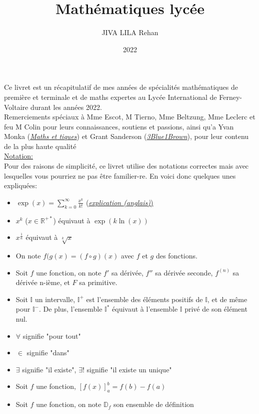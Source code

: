 \documentclass{article}
\title{Mathématiques lycée}
\author{JIVA LILA Rehan}
\date{2022\textemdash 2024}
\begin{document}
\maketitle
Ce livret est un récapitulatif de mes années de spécialités mathématiques de première et terminale et de maths expertes au Lycée International de Ferney-Voltaire durant les années 2022.\\
Remerciements spéciaux à Mme Escot, M Tierno, Mme Beltzung, Mme Leclerc et feu M Colin  pour leurs connaissances, soutiens et passions, ainsi qu'a Yvan Monka (\href{https://www.maths-et-tiques.fr/}{\textit{Maths et tiques}}) et Grant Sanderson (\href{https://www.3blue1brown.com}{\textit{3Blue1Brown}}), pour leur contenu de la plus haute qualité\\
\break
\underline{Notation:}\\
Pour des raisons de simplicité, ce livret utilise des notations correctes mais avec lesquelles vous pourriez ne pas être familier-re. En voici donc quelques unes expliquées:
\begin{itemize}
	\item $\exp(x) = \sum_{k=0}^{\infty} \frac{x^k}{k!}$ (\href{https://youtu.be/3d6DsjIBzJ4}{\underline{\textit{explication (anglais)})}}
	\item $x^k$ ($x\in\mathbb{R^{+*}}$) équivaut à $\exp(k\ln(x))$
	\item $x^\frac{1}{n}$ équivaut à $\sqrt[k]{x}$
	\item On note $f(g(x) = (f\circ g)(x)$ avec $f$ et $g$ des fonctions.
	\item Soit $f$ une fonction, on note $f'$ sa dérivée, $f''$ sa dérivée seconde, $f^{(n)}$ sa dérivée n-ième, et $F$ sa primitive.
	\item Soit $\mathbb{I}$ un intervalle, $\mathbb{I^+}$ est l'ensemble des éléments positifs de $\mathbb{I}$, et de même pour $\mathbb{I^-}$. De plus, l'ensemble $\mathbb{I^*}$ équivaut à l'ensemble $\mathbb{I}$ privé de son élément nul.
	\item $\forall$ signifie "pour tout"
	\item $\in$ signifie "dans"
	\item $\exists$ signifie "il existe", $\exists!$ signifie "il existe un unique"
	\item Soit $f$ une fonction, $[f(x)]_a^b = f(b)-f(a)$
	\item Soit $f$ une fonction, on note $\mathbb{D}_f$ son ensemble de définition 
\end{itemize}
\end{document}
